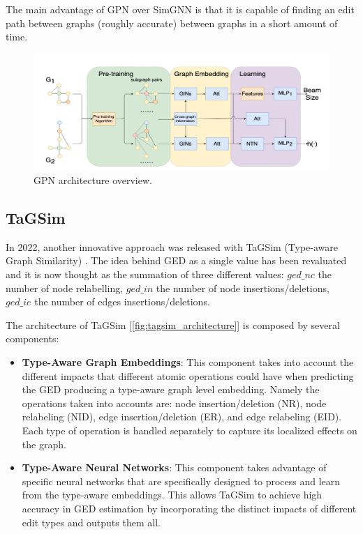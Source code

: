 \documentclass[../Thesis.tex]{subfiles}
\begin{document}
	The main advantage of GPN over SimGNN is that it is capable of finding an edit path between graphs (roughly accurate) between graphs in a short amount of time.
	
	\begin{figure}[H]
		\centering
		\includegraphics[width=\textwidth]{Images/gpn_architecture.png}
		\caption{GPN architecture overview.}
		\label{fig:gpn_architecture}
	\end{figure}
	
	
	\subsection{TaGSim}
	\label{sec:tagsim}
	
	In 2022, another innovative approach was released with TaGSim (Type-aware Graph Similarity) \cite{TaGSim_type_aware_graph_similarity_learning_and_computation}. The idea behind GED as a single value has been revaluated and it is now thought as the summation of three different values: $ged\_nc$ the number of node relabelling, $ged\_in$ the number of node insertions/deletions, $ged\_ie$ the number of edges insertions/deletions. 
	
	The architecture of TaGSim [\autoref{fig:tagsim_architecture}] is composed by several components:
	
	\begin{itemize}
		\item \textbf{Type-Aware Graph Embeddings}: This component takes into account the different impacts that different atomic operations could have when predicting the GED producing a type-aware graph level embedding. Namely the operations taken into accounts are: node insertion/deletion (NR), node relabeling (NID), edge insertion/deletion (ER), and edge relabeling (EID). Each type of operation is handled separately to capture its localized effects on the graph.
		\item \textbf{Type-Aware Neural Networks}: This component takes advantage of specific neural networks that are specifically designed to process and learn from the type-aware embeddings. This allows TaGSim to achieve high accuracy in GED estimation by incorporating the distinct impacts of different edit types and outputs them all.
	\end{itemize}
	
\end{document}
